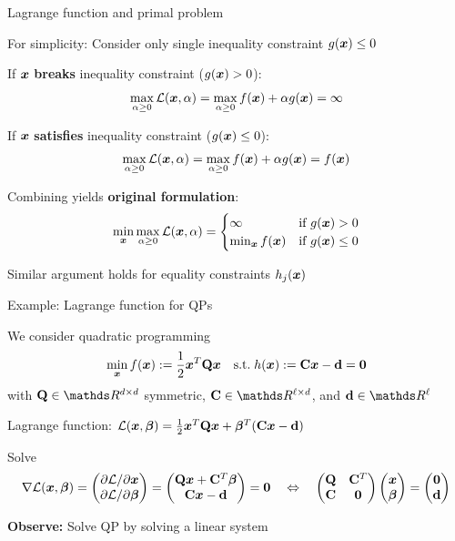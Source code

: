 \documentclass[11pt,compress,t,notes=noshow, xcolor=table]{beamer}
\begin{document}
\begin{framei}{Lagrange function and primal problem}
\item For simplicity: Consider only single inequality constraint $g(\bm{x}) \leq 0$
\vfill
\item If $\bm{x}$ \textbf{breaks} inequality constraint ($g(\bm{x}) > 0$):
$$
\max_{\alpha \ge 0} \mathcal{L}(\bm{x}, \alpha) = \max_{\alpha \ge 0} f(\bm{x}) +  \alpha g(\bm{x}) = \infty
$$
\item If $\bm{x}$ \textbf{satisfies} inequality constraint ($g(\bm{x}) \le 0$):
$$
\max_{\alpha \ge 0} \mathcal{L}(\bm{x}, \alpha) = \max_{\alpha \ge 0} f(\bm{x}) +  \alpha g(\bm{x}) = f(\bm{x})
$$
\vfill
\item Combining yields \textbf{original formulation}:
$$
\min_{\bm{x}} \max_{\alpha \ge 0} \mathcal{L}(\bm{x}, \alpha) =
\begin{cases}
\infty & \text{if } g(\bm{x}) > 0 \\
\min_{\bm{x}} f(\bm{x}) & \text{if }  g(\bm{x}) \le 0
\end{cases}
$$
\item Similar argument holds for equality constraints $h_j(\bm{x})$
\end{framei}


\begin{framei}[fs=small]{Example: Lagrange function for QPs}
\item We consider quadratic programming
$$
\min_{\bm{x}} f(\bm{x}) := \frac{1}{2} \bm{x}^T \mathbf{Q} \bm{x} \quad
\text{s.t.} \; h(\bm{x}) := \mathbf{C} \bm{x} - \mathbf{d} = \mathbf{0}
$$
with $\mathbf{Q} \in \R^{d\times d}$ symmetric, $\mathbf{C} \in \R^{\ell \times d}$, and $\mathbf{d} \in \R^\ell$
\item Lagrange function: $\mathcal{L}(\bm{x}, \bm{\beta}) = \frac{1}{2} \bm{x}^T \mathbf{Q} \bm{x} + \bm{\beta}^T (\mathbf{C} \bm{x} - \mathbf{d})$
\item Solve
$$
\nabla \mathcal{L}(\bm{x}, \bm{\beta}) =
\begin{pmatrix}
\partial \mathcal{L} / \partial \bm{x} \\
\partial \mathcal{L} / \partial {\bm{\beta}}
\end{pmatrix} =
\begin{pmatrix}
\mathbf{Q} \bm{x} + \mathbf{C}^T\bm{\beta} \\
\mathbf{C} \bm{x} - \mathbf{d}
\end{pmatrix} = \mathbf{0}
\quad \Leftrightarrow \quad
\begin{pmatrix}
\mathbf{Q} & \mathbf{C}^T \\
\mathbf{C} & \mathbf{0}
\end{pmatrix}
\begin{pmatrix} \bm{x} \\ \bm{\beta} \end{pmatrix} =
\begin{pmatrix} \mathbf{0} \\ \mathbf{d} \end{pmatrix}
$$
\item \textbf{Observe:} Solve QP by solving a linear system
\end{framei}
\end{document}
